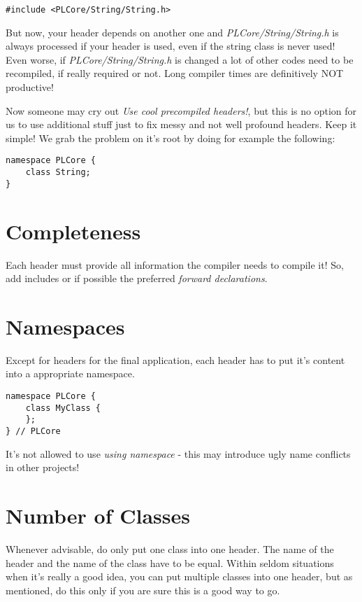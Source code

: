 \begin{lstlisting}[caption=Include]
#include <PLCore/String/String.h>
\end{lstlisting}

But now, your header depends on another one and \emph{PLCore/String/String.h} is always processed if your header is used, even if the string class is never used! Even worse, if \emph{PLCore/String/String.h} is changed a lot of other codes need to be recompiled, if really required or not. Long compiler times are definitively NOT productive!

Now someone may cry out \emph{Use cool precompiled headers!}, but this is no option for us to use additional stuff just to fix messy and not well profound headers. Keep it simple! We grab the problem on it's root by doing for example the following:

\begin{lstlisting}[caption=Forward declaration]
namespace PLCore {
	class String;
}
\end{lstlisting}




\section{Completeness}
Each header must provide all information the compiler needs to compile it! So, add includes or if possible the preferred \emph{forward declarations}.




\section{Namespaces}
Except for headers for the final application, each header has to put it's content into a appropriate namespace.

\begin{lstlisting}[caption=Namespace definition]
namespace PLCore {
	class MyClass {
	};
} // PLCore
\end{lstlisting}

It's not allowed to use \emph{using namespace} - this may introduce ugly name conflicts in other projects!




\section{Number of Classes}
Whenever advisable, do only put one class into one header. The name of the header and the name of the class have to be equal. Within seldom situations when it's really a good idea, you can put multiple classes into one header, but as mentioned, do this only if you are sure this is a good way to go.




